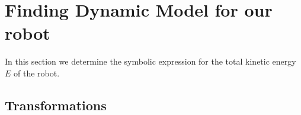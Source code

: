 \documentclass[a4paper,10pt]{article}
\begin{document}

\section{Finding Dynamic Model for our robot}
In this section we determine the symbolic expression for the  total kinetic energy $E$ of the robot.

\subsection{Transformations}
\end{document}
